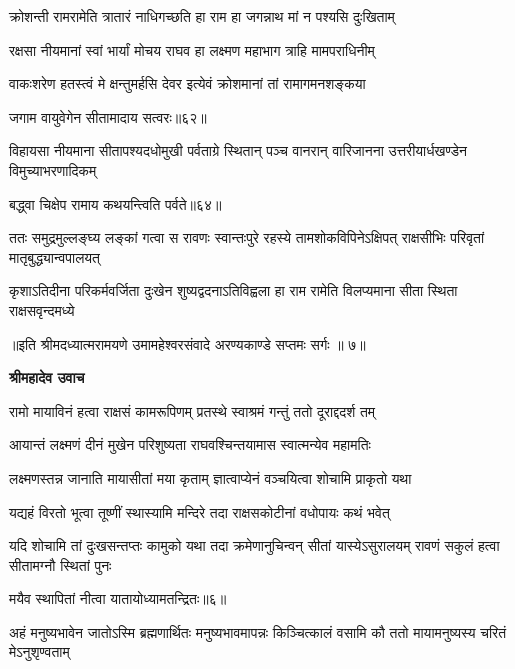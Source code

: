 \twolineshloka
{क्रोशन्ती रामरामेति त्रातारं नाधिगच्छति}
{हा राम हा जगन्नाथ मां न पश्यसि दुःखिताम्} %

\twolineshloka
{रक्षसा नीयमानां स्वां भार्यां मोचय राघव}
{हा लक्ष्मण महाभाग त्राहि मामपराधिनीम्} %

\twolineshloka
{वाकःशरेण हतस्त्वं मे क्षन्तुमर्हसि देवर}
{इत्येवं क्रोशमानां तां रामागमनशङ्कया} %

{जगाम वायुवेगेन सीतामादाय सत्वरः॥६२॥} %


\threelineshloka
{विहायसा नीयमाना सीतापश्यदधोमुखी}
{पर्वताग्रे स्थितान् पञ्च वानरान् वारिजानना}
{उत्तरीयार्धखण्डेन विमुच्याभरणादिकम्} %

{बद्ध्वा चिक्षेप रामाय कथयन्त्विति पर्वते॥६४॥} %


\threelineshloka
{ततः समुद्रमुल्लङ्घ्य लङ्कां गत्वा स रावणः}
{स्वान्तःपुरे रहस्ये तामशोकविपिनेऽक्षिपत्}
{राक्षसीभिः परिवृतां मातृबुद्ध्यान्वपालयत्} %

\fourlineindentedshloka
{कृशाऽतिदीना परिकर्मवर्जिता}
{दुःखेन शुष्यद्वदनाऽतिविह्वला}
{हा राम रामेति विलप्यमाना}
{सीता स्थिता राक्षसवृन्दमध्ये} %

{॥इति श्रीमदध्यात्मरामयणे उमामहेश्वरसंवादे
अरण्यकाण्डे सप्तमः सर्गः ॥ ७॥
}




\textbf{श्रीमहादेव उवाच}

\twolineshloka
{रामो मायाविनं हत्वा राक्षसं कामरूपिणम्}
{प्रतस्थे स्वाश्रमं गन्तुं ततो दूराद्ददर्श तम्} %

\twolineshloka
{आयान्तं लक्ष्मणं दीनं मुखेन परिशुष्यता}
{राघवश्चिन्तयामास स्वात्मन्येव महामतिः} %

\twolineshloka
{लक्ष्मणस्तन्न जानाति मायासीतां मया कृताम्}
{ज्ञात्वाप्येनं वञ्चयित्वा शोचामि प्राकृतो यथा} %

\twolineshloka
{यद्यहं विरतो भूत्वा तूष्णीं स्थास्यामि मन्दिरे}
{तदा राक्षसकोटीनां वधोपायः कथं भवेत्} %

\threelineshloka
{यदि शोचामि तां दुःखसन्तप्तः कामुको यथा}
{तदा क्रमेणानुचिन्वन् सीतां यास्येऽसुरालयम्}
{रावणं सकुलं हत्वा सीतामग्नौ स्थितां पुनः} %

{मयैव स्थापितां नीत्वा यातायोध्यामतन्द्रितः॥६॥} %


\threelineshloka
{अहं मनुष्यभावेन जातोऽस्मि ब्रह्मणार्थितः}
{मनुष्यभावमापन्नः किञ्चित्कालं वसामि कौ}
{ततो मायामनुष्यस्य चरितं मेऽनुशृण्वताम्} %

